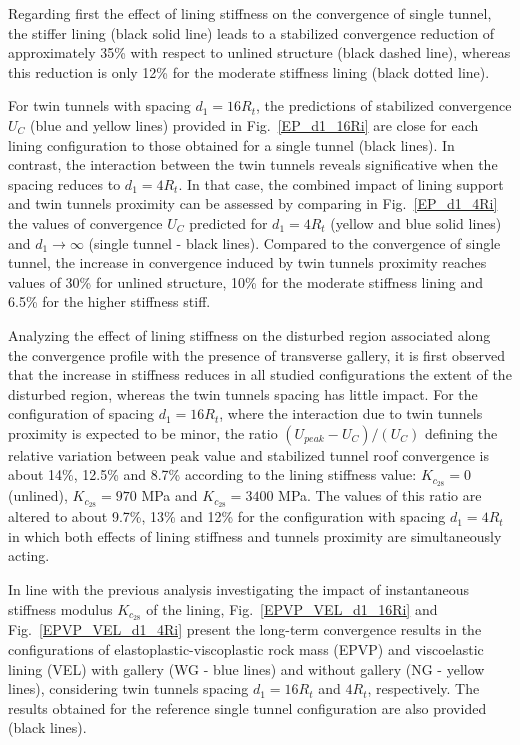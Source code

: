 \documentclass[a4paper,fleqn]{cas-sc}
\begin{document}
Regarding first the effect of lining stiffness on the convergence of single tunnel, the stiffer lining (black solid line) leads to a stabilized convergence reduction of approximately 35\% with respect to unlined structure (black dashed line), whereas this reduction is only 12\% for the moderate stiffness lining (black dotted line).

For twin tunnels with spacing $d_1=16R_t$, the predictions of stabilized convergence $U_C$ (blue and yellow lines) provided in Fig.~\ref{EP_d1_16Ri} are close for each lining configuration to those obtained for a single tunnel (black lines). In contrast, the interaction between the twin tunnels reveals significative when the spacing reduces to $d_1=4R_t$. In that case, the combined impact of lining support and twin tunnels proximity can be assessed by comparing in Fig.~\ref{EP_d1_4Ri} the values of convergence $U_C$ predicted for $d_1=4R_t$ (yellow and blue solid lines) and $d_1 \rightarrow \infty$ (single tunnel - black lines). Compared to the convergence of single tunnel, the increase in convergence induced by twin tunnels proximity reaches values of 30\% for unlined structure, 10\% for the moderate stiffness lining  and 6.5\% for the higher stiffness stiff. 


Analyzing the effect of lining stiffness on the disturbed region associated along the convergence profile with the presence of transverse gallery, it is first observed that the increase in stiffness reduces in all studied configurations the extent of the disturbed region, whereas the twin tunnels spacing has little impact. For the configuration of spacing $d_1=16R_t$, where the interaction due to twin tunnels proximity is expected to be minor,   the ratio $(U_{peak}-U_C)/(U_C)$ defining the relative variation between peak value and stabilized tunnel roof convergence is about 14\%, 12.5\% and 8.7\% according to the lining stiffness value: $K_{c_{28}}=0$ (unlined), $K_{c_{28}}=970$ MPa and $K_{c_{28}}=3400$ MPa. The values of this ratio are altered to about 9.7\%, 13\% and 12\% for the configuration with spacing $d_1=4R_t$ in which both effects of lining stiffness and tunnels proximity are simultaneously acting.

In line with the previous analysis investigating the impact of instantaneous stiffness modulus $K_{c_{28}}$ of the lining, Fig.~\ref{EPVP_VEL_d1_16Ri} and Fig.~\ref{EPVP_VEL_d1_4Ri} present the long-term convergence results in the configurations of elastoplastic-viscoplastic rock mass (EPVP) and  viscoelastic lining (VEL) with gallery (WG - blue lines) and without gallery (NG - yellow lines), considering  twin tunnels spacing $d_1=16R_t$ and $4R_t$, respectively. The results obtained for the reference single tunnel configuration are also provided (black lines).
\end{document}
